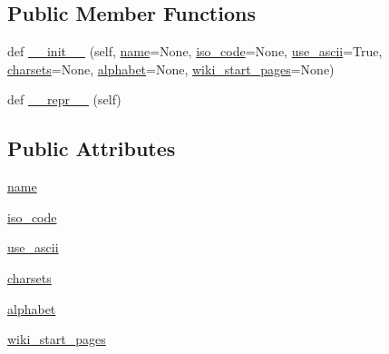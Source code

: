 \subsection*{Public Member Functions}
\begin{DoxyCompactItemize}
\item 
def \hyperlink{classpip_1_1__vendor_1_1chardet_1_1metadata_1_1languages_1_1Language_ae8dd610b8889c18351d4dbde869ca0b2}{\+\_\+\+\_\+init\+\_\+\+\_\+} (self, \hyperlink{classpip_1_1__vendor_1_1chardet_1_1metadata_1_1languages_1_1Language_a7b6904fe364579d6a1d93aa8729a7912}{name}=None, \hyperlink{classpip_1_1__vendor_1_1chardet_1_1metadata_1_1languages_1_1Language_abd073a5a5de1f4c10854dbd86068198f}{iso\+\_\+code}=None, \hyperlink{classpip_1_1__vendor_1_1chardet_1_1metadata_1_1languages_1_1Language_a077a97000400781d4bb8c0d321d8b58b}{use\+\_\+ascii}=True, \hyperlink{classpip_1_1__vendor_1_1chardet_1_1metadata_1_1languages_1_1Language_ab2ad0e186f4dd900c5745c06a24c4ffd}{charsets}=None, \hyperlink{classpip_1_1__vendor_1_1chardet_1_1metadata_1_1languages_1_1Language_a7015ef2420e160ed14b5d8932db2f5ad}{alphabet}=None, \hyperlink{classpip_1_1__vendor_1_1chardet_1_1metadata_1_1languages_1_1Language_ac752cae17887ef324efe8481e9e64c31}{wiki\+\_\+start\+\_\+pages}=None)
\item 
def \hyperlink{classpip_1_1__vendor_1_1chardet_1_1metadata_1_1languages_1_1Language_a39d2635a5ada47dcc5f9e909802d1469}{\+\_\+\+\_\+repr\+\_\+\+\_\+} (self)
\end{DoxyCompactItemize}
\subsection*{Public Attributes}
\begin{DoxyCompactItemize}
\item 
\hyperlink{classpip_1_1__vendor_1_1chardet_1_1metadata_1_1languages_1_1Language_a7b6904fe364579d6a1d93aa8729a7912}{name}
\item 
\hyperlink{classpip_1_1__vendor_1_1chardet_1_1metadata_1_1languages_1_1Language_abd073a5a5de1f4c10854dbd86068198f}{iso\+\_\+code}
\item 
\hyperlink{classpip_1_1__vendor_1_1chardet_1_1metadata_1_1languages_1_1Language_a077a97000400781d4bb8c0d321d8b58b}{use\+\_\+ascii}
\item 
\hyperlink{classpip_1_1__vendor_1_1chardet_1_1metadata_1_1languages_1_1Language_ab2ad0e186f4dd900c5745c06a24c4ffd}{charsets}
\item 
\hyperlink{classpip_1_1__vendor_1_1chardet_1_1metadata_1_1languages_1_1Language_a7015ef2420e160ed14b5d8932db2f5ad}{alphabet}
\item 
\hyperlink{classpip_1_1__vendor_1_1chardet_1_1metadata_1_1languages_1_1Language_ac752cae17887ef324efe8481e9e64c31}{wiki\+\_\+start\+\_\+pages}
\end{DoxyCompactItemize}



